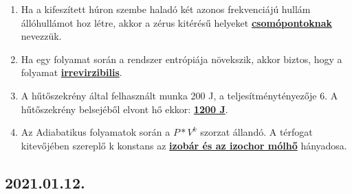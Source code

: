 \documentclass[../../fizika_kerdesek.tex]{subfiles}
\begin{document}
{\begin{enumerate}
                \item Ha a kifeszített húron szembe haladó két azonos frekvenciájú hullám állóhullámot hoz létre, akkor a zérus kitérésű helyeket \underline{\textbf{csomópontoknak}} nevezzük.
                \item Ha egy folyamat során a rendszer entrópiája növekszik, akkor biztos, hogy a folyamat \underline{\textbf{irrevirzibilis}}.
                \item A hűtőszekrény által felhasznált munka 200 J, a teljesítménytényezője 6. A hűtőszekrény belsejéből elvont hő ekkor: \underline{\textbf{1200 J}}.
                \item Az Adiabatikus folyamatok során a $P*V^k$ szorzat állandó. A térfogat kitevőjében szereplő k konstans az \underline{\textbf{izobár és az izochor mólhő}} hányadosa.
            \end{enumerate}}

    \subsection{2021.01.12.}
\end{document}

